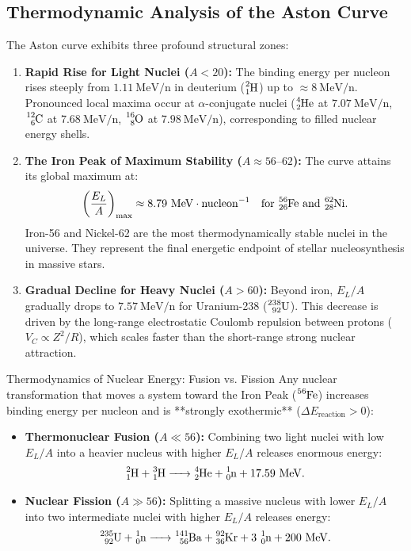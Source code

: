 \subsection{Thermodynamic Analysis of the Aston Curve}
The Aston curve exhibits three profound structural zones:
\begin{enumerate}[leftmargin=1.5em,itemsep=4pt]
  \item \textbf{Rapid Rise for Light Nuclei ($A < 20$):}
  The binding energy per nucleon rises steeply from $1.11\ \mathrm{MeV/n}$ in deuterium ($\ce{^2_1H}$) up to $\approx 8\ \mathrm{MeV/n}$. Pronounced local maxima occur at $\alpha$-conjugate nuclei ($\ce{^4_2He}$ at $7.07\ \mathrm{MeV/n}$, $\ce{^{12}_6C}$ at $7.68\ \mathrm{MeV/n}$, $\ce{^{16}_8O}$ at $7.98\ \mathrm{MeV/n}$), corresponding to filled nuclear energy shells.
  \item \textbf{The Iron Peak of Maximum Stability ($A \approx 56\text{--}62$):}
  The curve attains its global maximum at:
  \begin{equation}
  \left(\frac{E_L}{A}\right)_{\max} \approx 8.79\ \mathrm{MeV\cdot nucleon^{-1}} \quad \text{for } \ce{^{56}_{26}Fe} \text{ and } \ce{^{62}_{28}Ni}.
  \end{equation}
  Iron-56 and Nickel-62 are the most thermodynamically stable nuclei in the universe. They represent the final energetic endpoint of stellar nucleosynthesis in massive stars.
  \item \textbf{Gradual Decline for Heavy Nuclei ($A > 60$):}
  Beyond iron, $E_L / A$ gradually drops to $7.57\ \mathrm{MeV/n}$ for Uranium-238 ($\ce{^{238}_{92}U}$). This decrease is driven by the long-range electrostatic Coulomb repulsion between protons ($V_C \propto Z^2/R$), which scales faster than the short-range strong nuclear attraction.
\end{enumerate}

\begin{lawbox}{Thermodynamics of Nuclear Energy: Fusion vs. Fission}
Any nuclear transformation that moves a system toward the Iron Peak ($\ce{^{56}Fe}$) increases binding energy per nucleon and is **strongly exothermic** ($\Delta E_{\text{reaction}} > 0$):
\begin{itemize}[leftmargin=1.5em,itemsep=3pt]
  \item \textbf{Thermonuclear Fusion ($A \ll 56$):} Combining two light nuclei with low $E_L / A$ into a heavier nucleus with higher $E_L / A$ releases enormous energy:
  \[
  \ce{^2_1H + ^3_1H -> ^4_2He + ^1_0n} + 17.59\ \mathrm{MeV}.
  \]
  \item \textbf{Nuclear Fission ($A \gg 56$):} Splitting a massive nucleus with lower $E_L / A$ into two intermediate nuclei with higher $E_L / A$ releases energy:
  \[
  \ce{^{235}_{92}U + ^1_0n -> ^{141}_{56}Ba + ^{92}_{36}Kr + 3\,^1_0n} + 200\ \mathrm{MeV}.
  \]
\end{itemize}
\end{lawbox}

